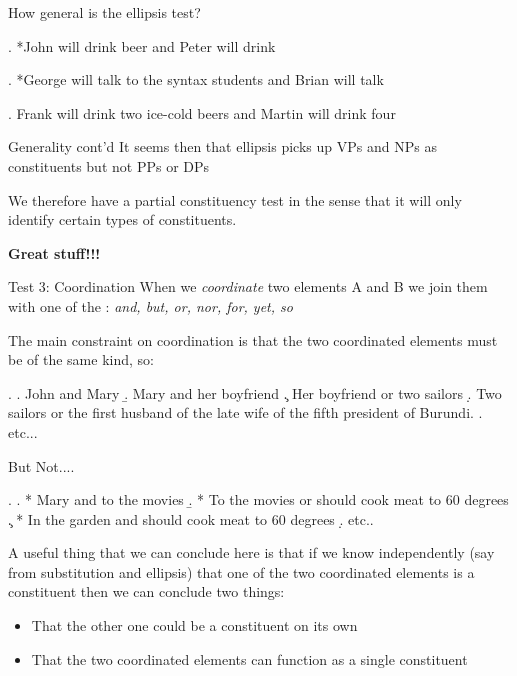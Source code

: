 \begin{frame}
  {How general is the ellipsis test?}

\ex.
*John will drink beer and Peter will drink \emp

\ex.
*George will talk to the syntax students and Brian will talk \emp

\ex.
Frank will drink two ice-cold beers and Martin will drink four \emp

\end{frame}

\begin{frame}
  {Generality cont'd}
It seems then that ellipsis picks up VPs and NPs as constituents but not PPs or DPs

We therefore have a partial constituency test in the sense that it will only identify certain types of constituents.  

\pause

\textbf{Great stuff!!!}

\end{frame}

\begin{frame}
    {Test 3: Coordination}
When we \textit{coordinate} two elements A and B we join them with one of the : \textit{and, but, or, nor, for, yet, so} 

The main constraint on coordination is that the two coordinated elements must be of the same kind, so:

\ex.
\a. John and Mary 
\b. Mary and her boyfriend
\c. Her boyfriend or two sailors
\d. Two sailors or the first husband of the late wife of the fifth president of Burundi.
\e. etc...


\end{frame}
\begin{frame}
  {But Not....}

\ex.
\a. * Mary and to the movies
\b. * To the movies or should cook meat to 60 degrees
\c. * In the garden and should cook meat to 60 degrees
\d. etc..


A useful thing that we can conclude here is that if we know independently (say from substitution and ellipsis) that one of the two coordinated elements is a constituent then we can conclude two things:
\begin{itemize}
\item That the other one could be a constituent on its own
\item That the two coordinated elements can function as a single constituent
\end{itemize}

\end{frame}

